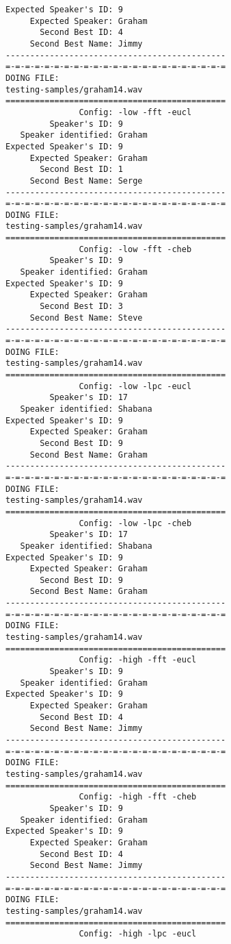 \begin{verbatim}
Expected Speaker's ID: 9
     Expected Speaker: Graham
       Second Best ID: 4
     Second Best Name: Jimmy
---------------------------------------------
=-=-=-=-=-=-=-=-=-=-=-=-=-=-=-=-=-=-=-=-=-=-=
DOING FILE:
testing-samples/graham14.wav
=============================================
               Config: -low -fft -eucl
         Speaker's ID: 9
   Speaker identified: Graham
Expected Speaker's ID: 9
     Expected Speaker: Graham
       Second Best ID: 1
     Second Best Name: Serge
---------------------------------------------
=-=-=-=-=-=-=-=-=-=-=-=-=-=-=-=-=-=-=-=-=-=-=
DOING FILE:
testing-samples/graham14.wav
=============================================
               Config: -low -fft -cheb
         Speaker's ID: 9
   Speaker identified: Graham
Expected Speaker's ID: 9
     Expected Speaker: Graham
       Second Best ID: 3
     Second Best Name: Steve
---------------------------------------------
=-=-=-=-=-=-=-=-=-=-=-=-=-=-=-=-=-=-=-=-=-=-=
DOING FILE:
testing-samples/graham14.wav
=============================================
               Config: -low -lpc -eucl
         Speaker's ID: 17
   Speaker identified: Shabana
Expected Speaker's ID: 9
     Expected Speaker: Graham
       Second Best ID: 9
     Second Best Name: Graham
---------------------------------------------
=-=-=-=-=-=-=-=-=-=-=-=-=-=-=-=-=-=-=-=-=-=-=
DOING FILE:
testing-samples/graham14.wav
=============================================
               Config: -low -lpc -cheb
         Speaker's ID: 17
   Speaker identified: Shabana
Expected Speaker's ID: 9
     Expected Speaker: Graham
       Second Best ID: 9
     Second Best Name: Graham
---------------------------------------------
=-=-=-=-=-=-=-=-=-=-=-=-=-=-=-=-=-=-=-=-=-=-=
DOING FILE:
testing-samples/graham14.wav
=============================================
               Config: -high -fft -eucl
         Speaker's ID: 9
   Speaker identified: Graham
Expected Speaker's ID: 9
     Expected Speaker: Graham
       Second Best ID: 4
     Second Best Name: Jimmy
---------------------------------------------
=-=-=-=-=-=-=-=-=-=-=-=-=-=-=-=-=-=-=-=-=-=-=
DOING FILE:
testing-samples/graham14.wav
=============================================
               Config: -high -fft -cheb
         Speaker's ID: 9
   Speaker identified: Graham
Expected Speaker's ID: 9
     Expected Speaker: Graham
       Second Best ID: 4
     Second Best Name: Jimmy
---------------------------------------------
=-=-=-=-=-=-=-=-=-=-=-=-=-=-=-=-=-=-=-=-=-=-=
DOING FILE:
testing-samples/graham14.wav
=============================================
               Config: -high -lpc -eucl

\end{verbatim}

